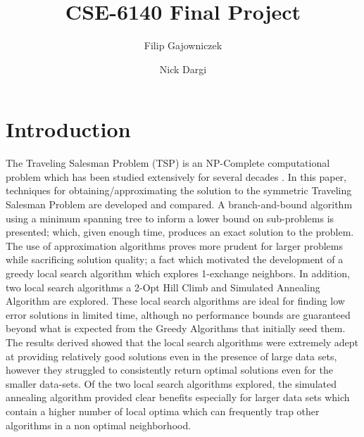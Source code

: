 \documentclass[format=sigconf]{acmart}
\begin{document}
\title{CSE-6140 Final Project}
\author{Filip Gajowniczek}
\author{Nick Dargi}


\section{Introduction}
The Traveling Salesman Problem (TSP) is an NP-Complete computational problem which has been studied extensively for several decades \cite{laporte_1992}. In this paper, techniques for obtaining/approximating the solution to the symmetric Traveling Salesman Problem are developed and compared. 
A branch-and-bound algorithm using a minimum spanning tree to inform a lower bound on sub-problems is presented; which, given enough time, produces an exact solution to the problem. The use of approximation algorithms proves more prudent for larger problems while sacrificing solution quality; a fact which motivated the development of a greedy local search algorithm which explores 1-exchange neighbors. 
In addition, two local search algorithms a 2-Opt Hill Climb and Simulated Annealing Algorithm are explored. 
These local search algorithms are ideal for finding low error solutions in limited time, although no performance bounds are guaranteed beyond 
what is expected from the Greedy Algorithms that initially seed them. The results derived showed that the local search algorithms were 
extremely adept at providing relatively good solutions even in the presence of large data sets, however they struggled to consistently return optimal solutions even for the smaller 
data-sets. Of the two local search algorithms explored, the simulated annealing algorithm provided clear benefits especially for larger data sets which contain a higher number of local optima which can frequently trap
 other algorithms in a non optimal neighborhood.
\end{document}
